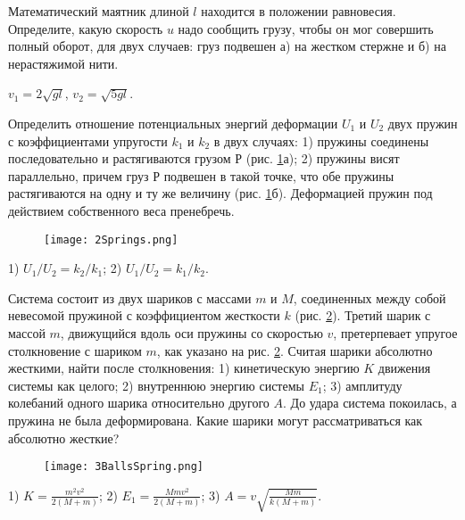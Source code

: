 \begin{ex} %
Математический маятник длиной $l$ находится в положении равновесия. Определите, какую скорость $u$ надо сообщить грузу, чтобы он мог совершить полный оборот, для двух случаев: груз подвешен а) на жестком стержне и б) на нерастяжимой нити.
\begin{ans}
$v_1 = 2\sqrt{gl}$, $v_2 = \sqrt{5gl}$.
\end{ans}
\end{ex}

\begin{ex} %
Определить отношение потенциальных энергий деформации $U_1$ и $U_2$ двух пружин с коэффициентами упругости $k_1$ и $k_2$ в двух случаях: 1) пружины соединены последовательно и растягиваются грузом $Р$ (рис. \ref{2Springs}а); 2) пружины висят параллельно, причем груз $Р$ подвешен в такой точке, что обе пружины растягиваются на одну и ту же величину (рис. \ref{2Springs}б). Деформацией пружин под действием собственного веса пренебречь.

\begin{figure}[h]
\centering
\texttt{[image: 2Springs.png]}
\caption{}
\label{2Springs}
\end{figure}

\begin{ans}
1) $U_1/U_2 = k_2/k_1$; 2) $U_1/U_2 = k_1/k_2$.
\end{ans}
\end{ex}

\complexProblems

\begin{ex} %
Система состоит из двух шариков с массами $m$ и $M$, соединенных между собой невесомой пружиной с коэффициентом жесткости $k$ (рис. \ref{3BallsSpring}). Третий шарик с массой $m$, движущийся вдоль оси пружины со скоростью $v$, претерпевает упругое столкновение с шариком $m$, как указано на рис. \ref{3BallsSpring}. Считая шарики абсолютно жесткими, найти после столкновения: 1) кинетическую энергию $K$ движения системы как целого; 2) внутреннюю энергию системы $E_1$; 3) амплитуду колебаний одного шарика относительно другого $A$. До удара система покоилась, а пружина не была деформирована. Какие шарики могут рассматриваться как абсолютно жесткие?	

\begin{figure}[h]
\centering
\texttt{[image: 3BallsSpring.png]}
\caption{}
\label{3BallsSpring}
\end{figure}

\begin{ans}
1) $K=\frac{m^2v^2}{2(M+m)}$; 2) $E_1 = \frac{Mmv^2}{2(M+m)}$; 3) $A = v\sqrt{\frac{Mm}{k(M+m)}}$.
\end{ans}
\end{ex}

